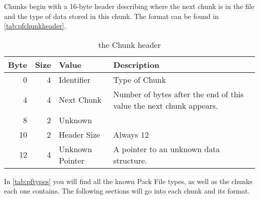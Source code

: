 Chunks begin with a 16-byte header describing where the next chunk is in the
file and the type of data stored in this chunk.  The format can be found in
\autoref{tab:pfchunkheader}.

\begin{table}[htp]\begin{center}
	\caption{the Chunk header}
	\label{tab:pfchunkheader}
	
	\begin{tabular}{|r|r|l|p{2.5in}|}
		\hline
		\textbf{Byte} & \textbf{Size} & \textbf{Value} & \textbf{Description} \\
		\hline
		 0 & 4 & Identifier      & Type of Chunk \\
		\hline
		 4 & 4 & Next Chunk      & Number of bytes after the end of this value
		                           the next chunk appears. \\
		\hline
		 8 & 2 & Unknown         & \\
		\hline
		10 & 2 & Header Size     & Always 12 \\
		\hline
		12 & 4 & Unknown Pointer & A pointer to an unknown data structure. \\
		\hline
	\end{tabular}
\end{center}\end{table}

In \autoref{tab:pftypes} you will find all the known Pack File types, as well
as the chunks each one contains.  The following sections will go into each chunk
and its format.

